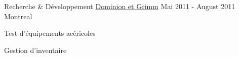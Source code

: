 

\begin{cventries}

  \cventry
  {Recherche \& Développement} %
  {\href{https://www.dominiongrimm.ca/en/home.html}{Dominion et Grimm}} %
    {Mai 2011 - August 2011} %
    {Montreal} %
    {
      \begin{cvitems} %
        \item {Test d'équipements acéricoles}
        \item {Gestion d'inventaire}
      \end{cvitems}
    }

\end{cventries}
